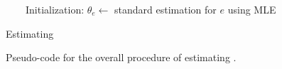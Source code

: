 \begin{figure}[!t]
\centering
\begin{algorithm}[H]
 \begin{algorithmic}[1]
 \Statex ~~~~Initialization: \vspace{2pt}
 \State $\theta_e \gets$ standard estimation for $e$ using MLE
 \EndFor
 \Repeat
 \State {}
 \State {} 
 \EndProcedure
 \end{algorithmic}
 \caption{Estimating \HSWLM}
\end{algorithm}
\caption{\label{alg:hswlm}Pseudo-code for the overall procedure of estimating \achswlm.}
\end{figure}